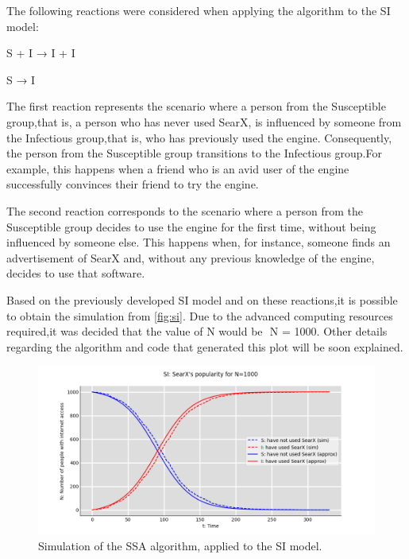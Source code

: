 \documentclass{article}
\begin{document}
The‌ ‌following‌ ‌reactions‌ ‌were‌ ‌considered‌ ‌when‌ ‌applying‌ ‌the‌ ‌algorithm‌ ‌to‌ ‌the‌ ‌SI‌ ‌model:‌ ‌

\begin{center}
S + I → I + I

S → I ‌‌
\end{center}

The‌‌ first‌‌ reaction‌‌ represents‌‌ the‌‌ scenario‌‌ where‌‌ a‌‌ person‌‌ from‌‌ the‌‌ Susceptible‌‌ group,‌‌that‌‌ is,‌‌ a‌‌ person ‌‌who‌‌ has‌‌ never‌‌ used‌‌ SearX,‌‌ is‌‌ influenced‌‌ by‌‌ someone‌‌ from‌‌ the‌‌ Infectious‌‌ group,‌‌that‌‌ is,‌‌ who‌ ‌has‌ ‌previously‌ ‌used‌ ‌the‌ ‌engine.‌ ‌Consequently,‌ ‌the‌ ‌person‌ ‌from‌ ‌the‌ ‌Susceptible‌ ‌group‌‌ transitions‌‌ to‌‌ the‌‌ Infectious‌‌ group.‌‌For‌‌ example,‌‌ this‌‌ happens‌‌ when‌‌ a‌‌ friend‌‌ who‌‌ is‌‌ an‌‌ avid‌‌ user‌‌ of‌ ‌the‌ ‌engine‌ ‌successfully‌ ‌convinces‌ ‌their‌ ‌friend‌ ‌to‌ ‌try‌ ‌the‌ ‌engine.‌‌

The‌ ‌second‌ ‌reaction‌ ‌corresponds‌ ‌to‌ ‌the‌ ‌scenario‌ ‌where‌ ‌a ‌‌person‌‌ from ‌‌the ‌‌Susceptible ‌‌group‌‌ decides‌ ‌to‌ ‌use‌ ‌the‌ ‌engine‌ ‌for‌ ‌the‌ ‌first‌ ‌time,‌ ‌without‌ ‌being‌ ‌influenced‌ ‌by‌ ‌someone‌ ‌else.‌ ‌This‌‌ happens‌ ‌when,‌ ‌for‌ ‌instance, someone‌ ‌finds‌ ‌an‌ ‌advertisement‌ ‌of‌ ‌SearX‌ ‌and, ‌without‌ ‌any‌ previous‌ ‌knowledge‌ ‌of‌ ‌the‌ ‌engine,‌ ‌decides‌ ‌to‌ ‌use‌ ‌that‌ ‌software.‌ ‌

Based ‌‌on‌‌ the‌‌ previously‌‌ developed‌‌ SI‌‌ model‌‌ and‌‌ on‌‌ these‌‌ reactions,‌‌it‌‌ is‌‌ possible‌‌ to‌‌ obtain‌‌ the‌‌ simulation‌‌ from \autoref{fig:si}.‌‌ Due‌‌ to‌‌ the‌‌ advanced‌‌ computing‌‌ resources‌‌ required,‌‌it‌‌ was‌‌ decided‌‌ that‌ ‌the‌ ‌value‌ ‌of‌ ‌N‌ ‌would‌ ‌be‌ ‌ N = 1000.‌ ‌Other‌ ‌details‌ ‌regarding‌ ‌the‌ ‌algorithm‌ ‌and‌ ‌code‌ ‌that‌‌
generated‌ ‌this‌ ‌plot‌ ‌will‌ ‌be‌ ‌soon‌ ‌explained.‌

\begin{figure}[h]
    \centering
    \includegraphics[width=0.8\linewidth]{si}
    \caption{Simulation‌ ‌of‌ ‌the‌ ‌SSA‌ ‌algorithm,‌ ‌applied‌ ‌to‌ ‌the‌ ‌SI‌ ‌model.‌‌}
    \label{fig:si}
\end{figure}
\end{document}
